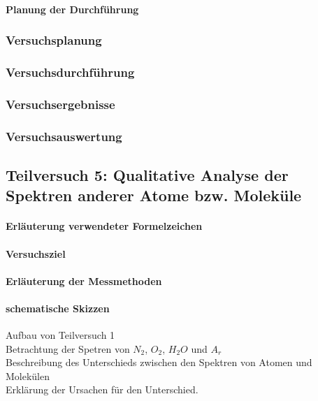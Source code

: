 \documentclass[12pt,oneside,oldfontcommands]{memoir}
\begin{document}
\paragraph{Planung der Durchführung}
\subsubsection{Versuchsplanung}
\subsubsection{Versuchsdurchführung}
\subsubsection{Versuchsergebnisse}
\subsubsection{Versuchsauswertung}

\subsection{Teilversuch 5: Qualitative Analyse der Spektren anderer Atome bzw.
Moleküle}
\paragraph{Erläuterung verwendeter Formelzeichen}
\paragraph{Versuchsziel}
\paragraph{Erläuterung der Messmethoden}
\paragraph{schematische Skizzen}

Aufbau von Teilversuch 1\\

Betrachtung der Spetren von $N_2$, $O_2$, $H_2O$ und $A_r$\\

Beschreibung des Unterschieds zwischen den Spektren von Atomen und Molekülen\\

Erklärung der Ursachen für den Unterschied.\\
\end{document}
